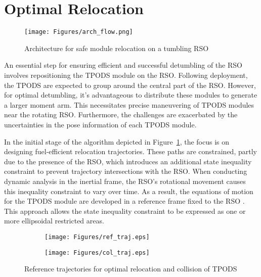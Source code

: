 \section{Optimal Relocation}\label{sec:optimal_reclocation}

\begin{figure}[!b]
\centerline{\texttt{[image: Figures/arch\_flow.png]}}
\caption{Architecture for safe module relocation on a tumbling RSO}
\label{fig:arch_flow}
\end{figure}

An essential step for ensuring efficient and successful detumbling of the RSO involves repositioning the TPODS module on the RSO. Following deployment, the TPODS are expected to group around the central part of the RSO. However, for optimal detumbling, it's advantageous to distribute these modules to generate a larger moment arm. This necessitates precise maneuvering of TPODS modules near the rotating RSO. Furthermore, the challenges are exacerbated by the uncertainties in the pose information of each TPODS module.

In the initial stage of the algorithm depicted in Figure~\ref{fig:arch_flow}, the focus is on designing fuel-efficient relocation trajectories. These paths are constrained, partly due to the presence of the RSO, which introduces an additional state inequality constraint to prevent trajectory intersections with the RSO. When conducting dynamic analysis in the inertial frame, the RSO's rotational movement causes this inequality constraint to vary over time. As a result, the equations of motion for the TPODS module are developed in a reference frame fixed to the RSO \cite{Parikh2021}. This approach allows the state inequality constraint to be expressed as one or more ellipsoidal restricted areas.

\begin{figure}[t!]
     \begin{subfigure}[b]{0.49\textwidth}
        \centering
         \texttt{[image: Figures/ref\_traj.eps]}
         \caption{}\label{fig:ref_traj_a}
     \end{subfigure}   
     \begin{subfigure}[b]{0.49\textwidth}
        \centering
         \texttt{[image: Figures/col\_traj.eps]}
         \caption{}\label{fig:ref_traj_b}
     \end{subfigure}
     \centering
    \caption{Reference trajectories for optimal relocation and collision of TPODS}
\end{figure}

